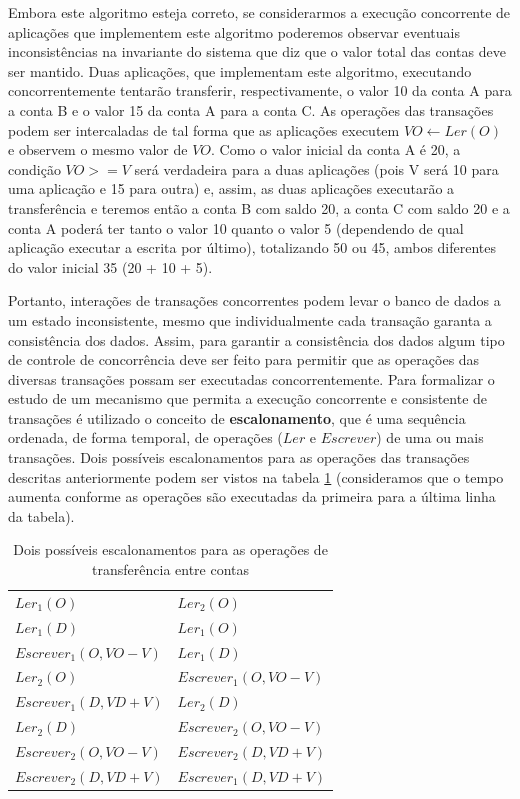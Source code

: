 \documentclass[11pt,twoside,a4paper]{book}
\begin{document}
Embora este algoritmo esteja correto, se considerarmos a execução concorrente de aplicações que implementem este algoritmo poderemos observar eventuais inconsistências na invariante do sistema que diz que o valor total das contas deve ser mantido. Duas aplicações, que implementam este algoritmo, executando concorrentemente tentarão transferir, respectivamente, o valor 10 da conta A para a conta B e o valor 15 da conta A para a conta C. As operações das transações podem ser intercaladas de tal forma que as aplicações executem $VO \gets Ler(O)$ e observem o mesmo valor de $VO$. Como o valor inicial da conta A é 20, a condição $VO >= V$ será verdadeira para a duas aplicações (pois V será 10 para uma aplicação e 15 para outra) e, assim, as duas aplicações executarão a transferência e teremos então a conta B com saldo 20, a conta C com saldo 20 e a conta A poderá ter tanto o valor 10 quanto o valor 5 (dependendo de qual aplicação executar a escrita por último), totalizando 50 ou 45, ambos diferentes do valor inicial 35 (20 + 10 + 5).

Portanto, interações de transações concorrentes podem levar o banco de dados a um estado inconsistente, mesmo que individualmente cada transação garanta a consistência dos dados. Assim, para garantir a consistência dos dados algum tipo de controle de concorrência deve ser feito para permitir que as operações das diversas transações possam ser executadas concorrentemente. Para formalizar o estudo de um mecanismo que permita a execução concorrente e consistente de transações é utilizado o conceito de \textbf{escalonamento}, que é uma sequência ordenada, de forma temporal, de operações ($Ler$ e $Escrever$) de uma ou mais transações. Dois possíveis escalonamentos para as operações das transações descritas anteriormente podem ser vistos na tabela \ref{tab:exemplo_escalonamento} (consideramos que o tempo aumenta conforme as operações são executadas da primeira para a última linha da tabela).

\begin{table}
\caption{Dois possíveis escalonamentos para as operações de transferência entre contas}
\label{tab:exemplo_escalonamento}
\centering
\begin{tabular}{ | l | l | }
	\hline
	$Ler_1(O)$&$Ler_2(O)$\\
	$Ler_1(D)$&$Ler_1(O)$\\
	$Escrever_1(O, VO - V)$&$Ler_1(D)$\\
	$Ler_2(O)$&$Escrever_1(O, VO - V)$\\
	$Escrever_1(D, VD + V)$&$Ler_2(D)$\\
	$Ler_2(D)$&$Escrever_2(O, VO - V)$\\
	$Escrever_2(O, VO - V)$&$Escrever_2(D, VD + V)$\\
	$Escrever_2(D, VD + V)$&$Escrever_1(D, VD + V)$\\
	\hline
\end{tabular}
\end{table}
\end{document}
